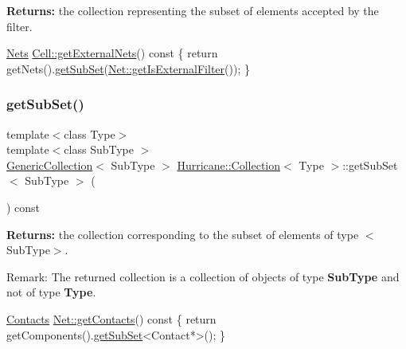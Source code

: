 {\bfseries Returns\+:} the collection representing the subset of elements accepted by the filter. 
\begin{DoxyCode}
\hyperlink{namespaceHurricane_a3404a8b17130a1824f4a281704b04df7}{Nets} \hyperlink{classHurricane_1_1Cell_aa80f3345db8c1395fa04a50737208793}{Cell::getExternalNets}()\textcolor{keyword}{ const}
\textcolor{keyword}{}\{
   \textcolor{keywordflow}{return} getNets().\hyperlink{classHurricane_1_1Collection_aa32ea7249d57ee05e3c71dcde8106832}{getSubSet}(\hyperlink{classHurricane_1_1Net_a3af91a80e219e37e70229e61dfd385da}{Net::getIsExternalFilter}());
\}
\end{DoxyCode}
 \mbox{\label{classHurricane_1_1Collection_a91d986e21395d4021d927e06f204ab6c}} 
\subsubsection{\texorpdfstring{get\+Sub\+Set()}{getSubSet()}\hspace{0.1cm}{\footnotesize\ttfamily [2/3]}}
{\footnotesize\ttfamily template$<$class Type$>$ \\
template$<$class Sub\+Type $>$ \\
\hyperlink{classHurricane_1_1GenericCollection}{Generic\+Collection}$<$ Sub\+Type $>$ \hyperlink{classHurricane_1_1Collection}{Hurricane\+::\+Collection}$<$ Type $>$\+::get\+Sub\+Set$<$ Sub\+Type $>$ (\begin{DoxyParamCaption}{ }\end{DoxyParamCaption}) const\hspace{0.3cm}{\ttfamily [inline]}}

{\bfseries Returns\+:} the collection corresponding to the subset of elements of type {\ttfamily $<$Sub\+Type$>$}.

\begin{DoxyParagraph}{Remark\+:}
The returned collection is a collection of objects of type {\bfseries Sub\+Type} and not of type {\bfseries Type}.
\end{DoxyParagraph}

\begin{DoxyCode}
\hyperlink{namespaceHurricane_a1e6a8ab09f688509bd727b3fee02d0d2}{Contacts} \hyperlink{classHurricane_1_1Net_a9c397596fe9ecbf674712c72e0b9010c}{Net::getContacts}()\textcolor{keyword}{ const}
\textcolor{keyword}{}\{
   \textcolor{keywordflow}{return} getComponents().\hyperlink{classHurricane_1_1Collection_aa32ea7249d57ee05e3c71dcde8106832}{getSubSet}<Contact*>();
\}
\end{DoxyCode}
 

